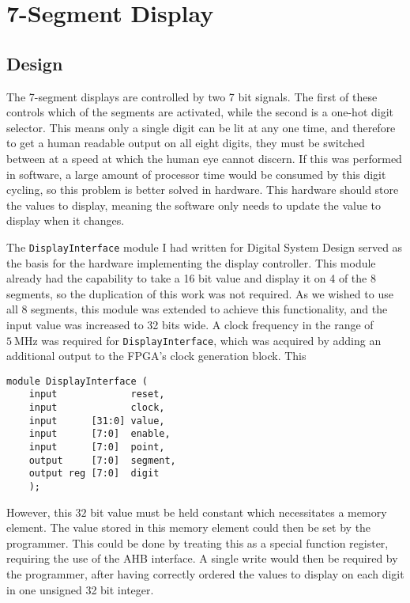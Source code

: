 \documentclass[11pt,british]{report}
\begin{document}
\section*{7-Segment Display}
\subsection*{Design}

The 7-segment displays are controlled by two 7 bit signals. The first of these controls which of the segments are activated, while the second is a one-hot digit selector. This means only a single digit can be lit at any one time, and therefore to get a human readable output on all eight digits, they must be switched between at a speed at which the human eye cannot discern. If this was performed in software, a large amount of processor time would be consumed by this digit cycling, so this problem is better solved in hardware. This hardware should store the values to display, meaning the software only needs to update the value to display when it changes.

The \texttt{DisplayInterface} module I had written for Digital System Design served as the basis for the hardware implementing the display controller. This module already had the capability to take a 16 bit value and display it on 4 of the 8 segments, so the duplication of this work was not required. As we wished to use all 8 segments, this module was extended to achieve this functionality, and the input value was increased to 32 bits wide.
A clock frequency in the range of $5~\si{\mega\hertz}$ was required for \texttt{DisplayInterface}, which was acquired by adding an additional output to the FPGA's clock generation block. This
\begin{lstlisting}[style={verilog-style}]
    module DisplayInterface (
    input             reset,
    input             clock,
    input      [31:0] value,
    input      [7:0]  enable,
    input      [7:0]  point,
    output     [7:0]  segment, 
    output reg [7:0]  digit
    );
\end{lstlisting}

However, this $32$ bit value must be held constant which necessitates a memory element. The value stored in this memory element could then be set by the programmer. This could be done by treating this as a special function register, requiring the use of the AHB interface. A single write would then be required by the programmer, after having correctly ordered the values to display on each digit in one unsigned 32 bit integer.
\end{document}
